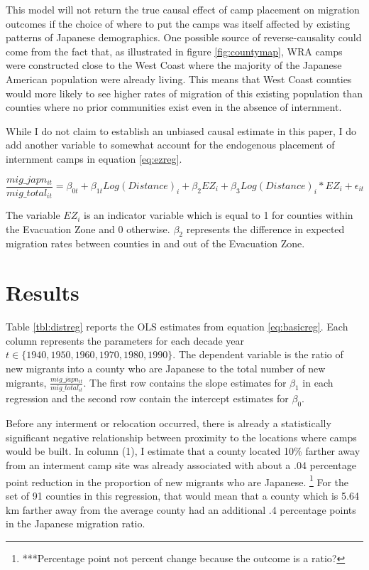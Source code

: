 \documentclass[12pt]{article}
\begin{document}
This model will not return the true causal effect of camp placement on migration outcomes if the choice of where to put the camps was itself affected by existing patterns of Japanese demographics.
One possible source of reverse-causality could come from the fact that, as illustrated in figure \ref{fig:countymap},
WRA camps were constructed close to the West Coast where the majority of the Japanese American population were already living. 
This means that West Coast counties would more likely to see higher rates of migration of this existing population than counties where no prior communities exist even in the absence of internment. 

While I do not claim to establish an unbiased causal estimate in this paper, 
I do add another variable to somewhat account for the endogenous placement of internment camps in equation \ref{eq:ezreg}.

\begin{equation}\label{eq:ezreg}
    \frac{mig\_japn_{it}}{mig\_total_{it}} = \beta_{0t} + \beta_{1t} Log(Distance)_i + \beta_2 EZ_i + \beta_3 Log(Distance)_i * EZ_i +  \epsilon_{it}
\end{equation}

The variable $EZ_i$ is an indicator variable which is equal to 1 for counties within the Evacuation Zone and 0 otherwise.
$\beta_2$ represents the difference in expected migration rates between counties in and out of the Evacuation Zone.


\section{Results}\label{results}


Table \ref{tbl:distreg} reports the OLS estimates from equation \ref{eq:basicreg}.
Each column represents the parameters for each decade year $t \in \{1940, 1950, 1960, 1970, 1980, 1990\}$.
The dependent variable is the ratio of new migrants into a county who are Japanese to the total number of new migrants, $\frac{mig\_japn_{it}}{mig\_total_{it}}$.
The first row contains the slope estimates for $\beta_1$ in each regression
and the second row contain the intercept estimates for $\beta_0$.

Before any interment or relocation occurred, there is already a statistically significant negative relationship between proximity to the locations where camps would be built.
In column (1), I estimate that a county located 10\% farther away from an interment camp site was already associated with about a .04 percentage point reduction in the proportion of new migrants who are Japanese.
\footnote{***Percentage point not percent change because the outcome is a ratio?}
For the set of 91 counties in this regression, that would mean that a county which is 5.64 km farther away from the average county had an additional .4 percentage points in the Japanese migration ratio.
\end{document}
